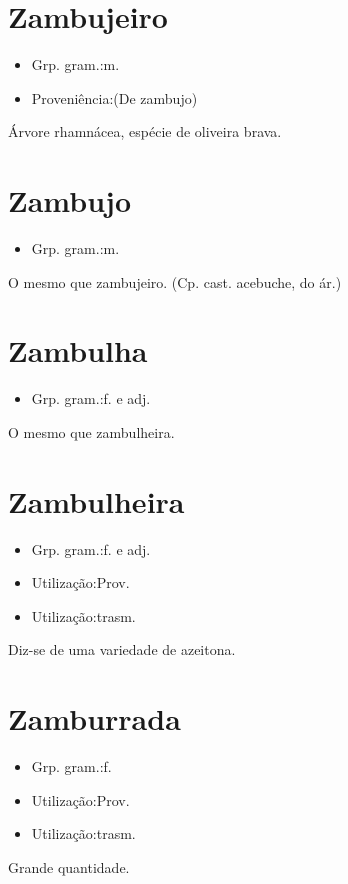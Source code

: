 \section{Zambujeiro}
\begin{itemize}
\item {Grp. gram.:m.}
\end{itemize}
\begin{itemize}
\item {Proveniência:(De \textunderscore zambujo\textunderscore )}
\end{itemize}
Árvore rhamnácea, espécie de oliveira brava.
\section{Zambujo}
\begin{itemize}
\item {Grp. gram.:m.}
\end{itemize}
O mesmo que \textunderscore zambujeiro\textunderscore .
(Cp. cast. \textunderscore acebuche\textunderscore , do ár.)
\section{Zambulha}
\begin{itemize}
\item {Grp. gram.:f.  e  adj.}
\end{itemize}
O mesmo que \textunderscore zambulheira\textunderscore .
\section{Zambulheira}
\begin{itemize}
\item {Grp. gram.:f.  e  adj.}
\end{itemize}
\begin{itemize}
\item {Utilização:Prov.}
\end{itemize}
\begin{itemize}
\item {Utilização:trasm.}
\end{itemize}
Diz-se de uma variedade de azeitona.
\section{Zamburrada}
\begin{itemize}
\item {Grp. gram.:f.}
\end{itemize}
\begin{itemize}
\item {Utilização:Prov.}
\end{itemize}
\begin{itemize}
\item {Utilização:trasm.}
\end{itemize}
Grande quantidade.
